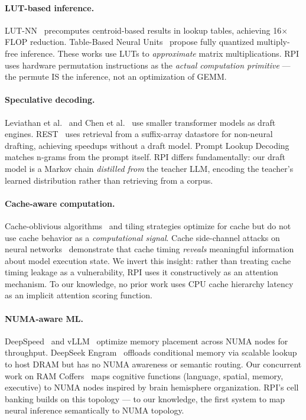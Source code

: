 \documentclass[10pt,twocolumn]{article}
\begin{document}
\paragraph{LUT-based inference.} LUT-NN~\cite{tang2023lutnn} precomputes centroid-based results in lookup tables, achieving 16$\times$ FLOP reduction. Table-Based Neural Units~\cite{tann2019table} propose fully quantized multiply-free inference. These works use LUTs to \emph{approximate} matrix multiplications. RPI uses hardware permutation instructions as the \emph{actual computation primitive} --- the permute IS the inference, not an optimization of GEMM.

\paragraph{Speculative decoding.} Leviathan et al.~\cite{leviathan2023speculative} and Chen et al.~\cite{chen2023accelerating} use smaller transformer models as draft engines. REST~\cite{he2023rest} uses retrieval from a suffix-array datastore for non-neural drafting, achieving speedups without a draft model. Prompt Lookup Decoding~\cite{saxena2023pld} matches n-grams from the prompt itself. RPI differs fundamentally: our draft model is a Markov chain \emph{distilled from} the teacher LLM, encoding the teacher's learned distribution rather than retrieving from a corpus.

\paragraph{Cache-aware computation.} Cache-oblivious algorithms~\cite{frigo1999cache} and tiling strategies optimize for cache but do not use cache behavior as a \emph{computational signal}. Cache side-channel attacks on neural networks~\cite{yan2018cache} demonstrate that cache timing \emph{reveals} meaningful information about model execution state. We invert this insight: rather than treating cache timing leakage as a vulnerability, RPI uses it constructively as an attention mechanism. To our knowledge, no prior work uses CPU cache hierarchy latency as an implicit attention scoring function.

\paragraph{NUMA-aware ML.} DeepSpeed~\cite{rasley2020deepspeed} and vLLM~\cite{kwon2023efficient} optimize memory placement across NUMA nodes for throughput. DeepSeek Engram~\cite{deepseek2026engram} offloads conditional memory via scalable lookup to host DRAM but has no NUMA awareness or semantic routing. Our concurrent work on RAM Coffers~\cite{boudreaux2025coffers} maps cognitive functions (language, spatial, memory, executive) to NUMA nodes inspired by brain hemisphere organization. RPI's cell banking builds on this topology --- to our knowledge, the first system to map neural inference semantically to NUMA topology.
\end{document}
